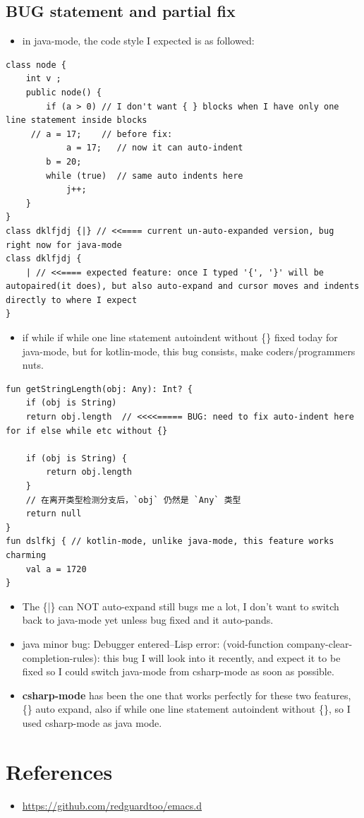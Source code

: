 \documentclass[9pt, b5paper]{article}
\begin{document}
\subsection{BUG statement and partial fix}
\label{sec:org61b3b7d}
\begin{itemize}
\item in java-mode, the code style I expected is as followed:
\end{itemize}
\begin{verbatim}
class node {
    int v ;
    public node() {
        if (a > 0) // I don't want { } blocks when I have only one line statement inside blocks
     // a = 17;    // before fix:
            a = 17;   // now it can auto-indent
        b = 20;
        while (true)  // same auto indents here
            j++;
    }
}
class dklfjdj {|} // <<==== current un-auto-expanded version, bug right now for java-mode
class dklfjdj { 
    | // <<==== expected feature: once I typed '{', '}' will be autopaired(it does), but also auto-expand and cursor moves and indents directly to where I expect
}
\end{verbatim}
\begin{itemize}
\item if while if while one line statement autoindent without \{\} fixed today for java-mode, but for kotlin-mode, this bug consists, make coders/programmers nuts.
\end{itemize}
\begin{verbatim}
fun getStringLength(obj: Any): Int? {
    if (obj is String)
    return obj.length  // <<<<===== BUG: need to fix auto-indent here for if else while etc without {} 

    if (obj is String) {
        return obj.length
    }
    // 在离开类型检测分支后，`obj` 仍然是 `Any` 类型
    return null
}
fun dslfkj { // kotlin-mode, unlike java-mode, this feature works charming
    val a = 1720 
}
\end{verbatim}
\begin{itemize}
\item The \{|\} can NOT auto-expand still bugs me a lot, I don't want to switch back to java-mode yet unless bug fixed and it auto-pands.
\item java minor bug: Debugger entered--Lisp error: (void-function company-clear-completion-rules): this bug I will look into it recently, and expect it to be fixed so I could switch java-mode from csharp-mode as soon as possible.
\end{itemize}
\begin{itemize}
\item \textbf{csharp-mode} has been the one that works perfectly for these two features, \{\} auto expand, also if while one line statement autoindent without \{\}, so I used csharp-mode as java mode.
\end{itemize}
\section{References}
\label{sec:orgb43115d}
\begin{itemize}
\item \url{https://github.com/redguardtoo/emacs.d}
\end{itemize}
\end{document}

